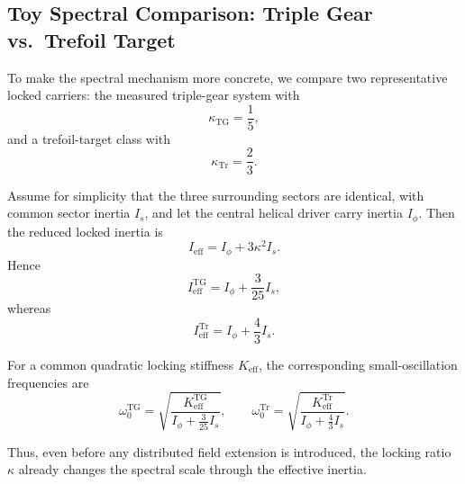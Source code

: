 \documentclass[11pt]{article}
\begin{document}
    
    \subsection{Toy Spectral Comparison: Triple Gear vs.\ Trefoil Target}
    \label{subsec:toy_spectral_comparison}
    
    To make the spectral mechanism more concrete, we compare two representative locked carriers:
    the measured triple-gear system with
    \begin{equation}
        \kappa_{\mathrm{TG}}=\frac{1}{5},
    \end{equation}
    and a trefoil-target class with
    \begin{equation}
        \kappa_{\mathrm{Tr}}=\frac{2}{3}.
    \end{equation}
    
    Assume for simplicity that the three surrounding sectors are identical, with common sector inertia
    \(I_s\), and let the central helical driver carry inertia \(I_\phi\). Then the reduced locked inertia is
    \begin{equation}
        I_{\mathrm{eff}} = I_\phi + 3\kappa^2 I_s.
        \label{eq:Ieff_toy_general}
    \end{equation}
    Hence
    \begin{equation}
        I_{\mathrm{eff}}^{\mathrm{TG}}
        =
        I_\phi + \frac{3}{25}I_s,
        \label{eq:Ieff_toy_TG}
    \end{equation}
    whereas
    \begin{equation}
        I_{\mathrm{eff}}^{\mathrm{Tr}}
        =
        I_\phi + \frac{4}{3}I_s.
        \label{eq:Ieff_toy_Tr}
    \end{equation}
    
    For a common quadratic locking stiffness \(K_{\mathrm{eff}}\), the corresponding small-oscillation
    frequencies are
    \begin{equation}
        \omega_0^{\mathrm{TG}}
        =
        \sqrt{
            \frac{K_{\mathrm{eff}}^{\mathrm{TG}}}
            {I_\phi + \frac{3}{25}I_s}
        },
        \qquad
        \omega_0^{\mathrm{Tr}}
        =
        \sqrt{
            \frac{K_{\mathrm{eff}}^{\mathrm{Tr}}}
            {I_\phi + \frac{4}{3}I_s}
        }.
        \label{eq:omega0_toy_compare}
    \end{equation}
    
    Thus, even before any distributed field extension is introduced, the locking ratio \(\kappa\)
    already changes the spectral scale through the effective inertia.
    
\end{document}
